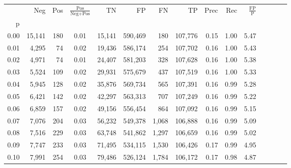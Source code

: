 \begin{tabular}{rrrcrrrrrrrrrrr}
\toprule
{} &     Neg &    Pos & $\frac{\text{Pos}}{\text{Neg}+\text{Pos}}$ &       TN &       FP &       FN &       TP &  Prec &   Rec & $\frac{\text{FP}}{\text{P}}$ \\
p    &         &        &                                            &          &          &          &          &       &       &                              \\
\midrule
0.00 &  15,141 &    180 &                                       0.01 &   15,141 &  590,469 &      180 &  107,776 &  0.15 &  1.00 &                         5.47 \\
0.01 &   4,295 &     74 &                                       0.02 &   19,436 &  586,174 &      254 &  107,702 &  0.16 &  1.00 &                         5.43 \\
0.02 &   4,971 &     74 &                                       0.01 &   24,407 &  581,203 &      328 &  107,628 &  0.16 &  1.00 &                         5.38 \\
0.03 &   5,524 &    109 &                                       0.02 &   29,931 &  575,679 &      437 &  107,519 &  0.16 &  1.00 &                         5.33 \\
0.04 &   5,945 &    128 &                                       0.02 &   35,876 &  569,734 &      565 &  107,391 &  0.16 &  0.99 &                         5.28 \\
0.05 &   6,421 &    142 &                                       0.02 &   42,297 &  563,313 &      707 &  107,249 &  0.16 &  0.99 &                         5.22 \\
0.06 &   6,859 &    157 &                                       0.02 &   49,156 &  556,454 &      864 &  107,092 &  0.16 &  0.99 &                         5.15 \\
0.07 &   7,076 &    204 &                                       0.03 &   56,232 &  549,378 &    1,068 &  106,888 &  0.16 &  0.99 &                         5.09 \\
0.08 &   7,516 &    229 &                                       0.03 &   63,748 &  541,862 &    1,297 &  106,659 &  0.16 &  0.99 &                         5.02 \\
0.09 &   7,747 &    233 &                                       0.03 &   71,495 &  534,115 &    1,530 &  106,426 &  0.17 &  0.99 &                         4.95 \\
0.10 &   7,991 &    254 &                                       0.03 &   79,486 &  526,124 &    1,784 &  106,172 &  0.17 &  0.98 &                         4.87 \\

\end{tabular}
